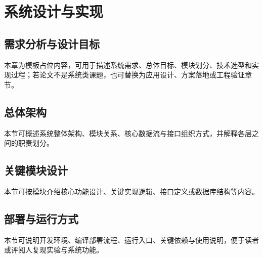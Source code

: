 \section{系统设计与实现}\label{chap:system}

\subsection{需求分析与设计目标}

本章为模板占位内容，可用于描述系统需求、总体目标、模块划分、技术选型和实现过程；若论文不是系统类课题，也可替换为应用设计、方案落地或工程验证章节。

\subsection{总体架构}

本节可概述系统整体架构、模块关系、核心数据流与接口组织方式，并解释各层之间的职责划分。

\subsection{关键模块设计}

本节可按模块介绍核心功能设计、关键实现逻辑、接口定义或数据库结构等内容。

\subsection{部署与运行方式}

本节可说明开发环境、编译部署流程、运行入口、关键依赖与使用说明，便于读者或评阅人复现实验与系统功能。
